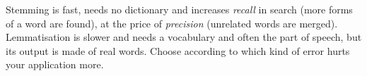 \begin{nbintuition}
Stemming is fast, needs no dictionary and increases \emph{recall} in search (more forms
of a word are found), at the price of \emph{precision} (unrelated words are merged).
Lemmatisation is slower and needs a vocabulary and often the part of speech, but its
output is made of real words. Choose according to which kind of error hurts your
application more.
\end{nbintuition}
